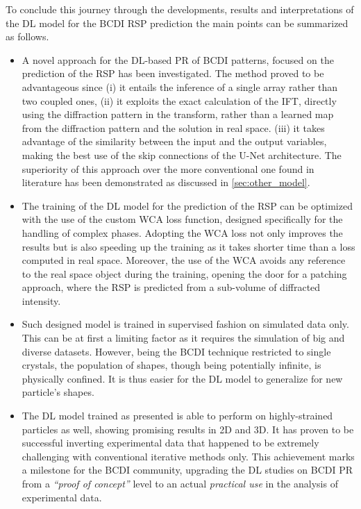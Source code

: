 To conclude this journey through the developments, results and interpretations of the DL model for the BCDI RSP prediction 
the main points can be summarized as follows.
\begin{itemize}

    \item A novel approach for the DL-based PR of BCDI patterns, focused on the prediction of the RSP has been investigated. 
    The method proved to be advantageous since (i) it entails the inference of a single array rather than two coupled ones, 
    (ii) it exploits the exact calculation of the IFT, directly using the diffraction pattern in the transform, rather than 
    a learned map from the diffraction pattern and the solution in real space. (iii) it takes advantage of the similarity between 
    the input and the output variables, making the best use of the skip connections of the U-Net architecture.
    The superiority of this approach over the more conventional one found in literature has been demonstrated as discussed in 
    \ref{sec:other_model}. 

    \item The training of the DL model for the prediction of the RSP can be optimized with the use of the custom WCA loss function, 
    designed specifically for the handling of complex phases. Adopting the WCA loss not only improves the results but is also 
    speeding up the training as it takes shorter time than a loss computed in real space. Moreover, the use of the WCA avoids 
    any reference to the real space object during the training, opening the door for a patching approach, where the RSP is 
    predicted from a sub-volume of diffracted intensity. 

    \item Such designed model is trained in supervised fashion on simulated data only. This can be at first a limiting factor 
    as it requires the simulation of big and diverse datasets. However, being the BCDI technique restricted to single 
    crystals, the population of shapes, though being potentially infinite, is physically confined. It is thus easier for 
    the DL model to generalize for new particle's shapes. 

    \item The DL model trained as presented is able to perform on highly-strained particles as well, showing promising
    results in 2D and 3D. It has proven to be successful inverting experimental data that happened to be extremely challenging with 
    conventional iterative methods only. This achievement marks a milestone for the BCDI community, upgrading the DL studies
    on BCDI PR from a \textit{``proof of concept''} level to an actual \textit{practical use} in the analysis of experimental data. 


\end{itemize}
